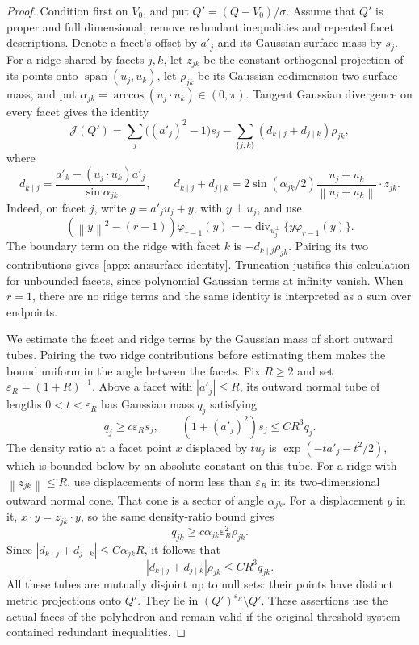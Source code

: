 \documentclass[11pt,letterpaper]{article}
\theoremstyle{remark}
\newcommand{\norm}[1]{\left\lVert#1\right\rVert}
\newcommand{\surf}{\mathcal J}
\begin{document}
\begin{proof}
Condition first on \(V_0\), and put \(Q'=(Q-V_0)/\sigma\).
Assume that \(Q'\) is proper and full dimensional; remove redundant
inequalities and repeated facet descriptions.  Denote a facet's
offset by \(a'_j\) and its Gaussian surface mass by \(s_j\).
For a ridge shared by facets \(j,k\), let \(z_{jk}\) be the constant
orthogonal projection of its points onto
\(\operatorname{span}(u_j,u_k)\), let \(\rho_{jk}\) be its Gaussian
codimension-two surface mass, and put
\(\alpha_{jk}=\arccos(u_j\cdot u_k)\in(0,\pi)\).
Tangent Gaussian divergence on every facet gives the identity
\begin{equation}
 \surf(Q')=
 \sum_j\bigl((a'_j)^2-1\bigr)s_j
 -\sum_{\{j,k\}}(d_{k\mid j}+d_{j\mid k})\rho_{jk},
 \label{appx-an:surface-identity}
\end{equation}
where
\[
 d_{k\mid j}=
 \frac{a'_k-(u_j\cdot u_k)a'_j}{\sin\alpha_{jk}},
 \qquad
 d_{k\mid j}+d_{j\mid k}
 =2\sin(\alpha_{jk}/2)
    \frac{u_j+u_k}{\norm{u_j+u_k}}\cdot z_{jk}.
\]
Indeed, on facet \(j\), write \(g=a'_ju_j+y\), with \(y\perp u_j\),
and use
\[
 (\norm{y}^2-(r-1))\varphi_{r-1}(y)
 =-\operatorname{div}_{u_j^\perp}
                  \{y\varphi_{r-1}(y)\}.
\]
The boundary term on the ridge with facet \(k\) is
\(-d_{k\mid j}\rho_{jk}\).  Pairing its two contributions gives
\eqref{appx-an:surface-identity}.  Truncation justifies this calculation
for unbounded facets, since polynomial Gaussian terms at infinity
vanish.  When \(r=1\), there are no ridge terms and the same identity
is interpreted as a sum over endpoints.

We estimate the facet and ridge terms by the Gaussian mass of short
outward tubes.  Pairing the two ridge contributions before estimating
them makes the bound uniform in the angle between the facets.  Fix
\(R\ge2\) and
set \(\varepsilon_R=(1+R)^{-1}\).  Above a facet with
\(|a'_j|\le R\), its outward normal tube of lengths
\(0<t<\varepsilon_R\) has Gaussian mass \(q_j\) satisfying
\[
 q_j\ge c\varepsilon_Rs_j,
 \qquad (1+(a'_j)^2)s_j\le CR^3q_j.
\]
The density ratio at a facet point \(x\) displaced by \(tu_j\) is
\(\exp(-ta'_j-t^2/2)\), which is bounded below by an absolute
constant on this tube.  For a ridge with \(\norm{z_{jk}}\le R\),
use displacements of norm less than \(\varepsilon_R\) in its
two-dimensional outward normal cone.  That cone is a sector of angle
\(\alpha_{jk}\).  For a displacement \(y\) in it,
\(x\cdot y=z_{jk}\cdot y\), so the same density-ratio bound gives
\[
 q_{jk}\ge c\alpha_{jk}\varepsilon_R^2\rho_{jk}.
\]
Since
\( |d_{k\mid j}+d_{j\mid k}|\le C\alpha_{jk}R\), it follows that
\[
 |d_{k\mid j}+d_{j\mid k}|\rho_{jk}\le CR^3q_{jk}.
\]
All these tubes are mutually disjoint up to null sets: their points
have distinct metric projections onto \(Q'\).  They lie in
\((Q')^{\varepsilon_R}\setminus Q'\).  These assertions use the
actual faces of the polyhedron and remain valid if the original
threshold system contained redundant inequalities.


\end{proof}
\end{document}
